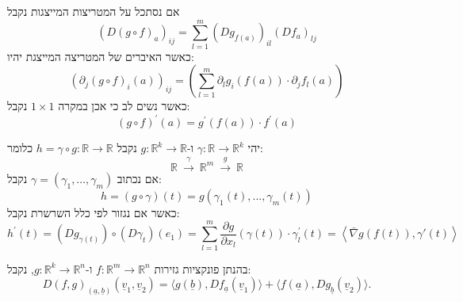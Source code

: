 \documentclass{tstextbook}
\begin{document}
אם נסתכל על המטריצות המייצגות נקבל $$\left(D(g\circ f)_{a}\right)_{i j}=\sum_{l=1}^{m}\left(D g_{f(a)}\right)_{i l}\left(D f_{a}\right)_{l j}$$
כאשר האיברים של המטריצה המייצגת יהיו:
$$(\partial_{j}(g\circ f)_{i}(a))_{i j}=\left(\sum_{l=1}^{m}\partial_{l}g_{i}(f(a))\cdot\partial_{j}f_{l}(a)\right)$$
כאשר נשים לב כי אכן במקרה \(1\times 1\) נקבל:
$$(g\circ f)^{\prime}(a)=g^{\prime}(f(a))\cdot f^{\prime}(a)$$

\begin{example}
יהי \(\gamma:\mathbb{R}\to\mathbb{R}^k\) ו-\(g:\mathbb{R}^k\to\mathbb{R}\) נקבל \(h=\gamma \circ g:\mathbb{R}\to\mathbb{R}\) כלומר:
$$\mathbb{R}\ {\stackrel{\gamma}{\to}}\ \mathbb{R}^{m}\ {\stackrel{g}{\to}}\ \mathbb{R}$$
אם נכתוב \(\gamma=\left( \gamma_{1},\dots,\gamma_{m} \right)\) נקבל:
$$h=(g\circ\gamma)(t)=g(\gamma_{1}(t),...,\gamma_{m}(t))$$
כאשר אם נגזור לפי כלל השרשרת נקבל:
$$h^{\prime}(t)=\left( D g_{\gamma(t)} \right)\circ\left( D\gamma_{t} \right)(e_{1})=\sum_{l=1}^{m}\frac{\partial g}{\partial x_{l}}\left( \gamma(t) \right)\cdot\gamma_{l}^{\prime}(t)=\left\langle  \bar{\nabla} g(f(t)), \gamma'(t)  \right\rangle $$

\end{example}
\begin{proposition}
בהנתן פונקציות גזירות \(f:\mathbb{R}^m\to \mathbb{R}^n\) ו-\(g:\mathbb{R}^k\to\mathbb{R}^n\), נקבל:
$$D(f,g)_{(\underline{{a}},\underline{{b}})}(\underline{{v}}_{1},\underline{{v}}_{2})=\langle g(\underline{{b}}),D f_{\underline{{a}}}(\underline{{v}}_{1})\rangle+\langle f({\underline{{a}}}),D g_{\underline{{b}}}(\underline{{v}}_{2})\rangle.$$

\end{proposition}
\end{document}
